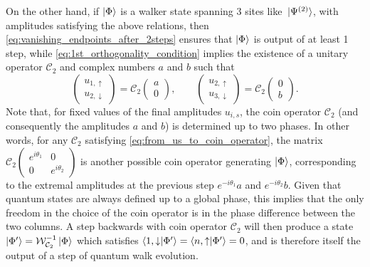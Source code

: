On the other hand, if $\ket\Phi$ is a walker state spanning $3$ sites like $\ket*{\Psi^{(2)}}$, with amplitudes satisfying the above relations,
then \cref{eq:vanishing_endpoints_after_2steps} ensures that $\ket\Phi$ is output of at least 1 step,
while \cref{eq:1st_orthogonality_condition} implies the existence of a unitary operator $\mathcal C_2$ and complex numbers $a$ and $b$ such that
\begin{equation}
	\begin{pmatrix}
		u_{1, \uparrow} \\ u_{2, \downarrow}
	\end{pmatrix}
	=
	\mathcal C_2
	\begin{pmatrix}
		a \\ 0
	\end{pmatrix},
	\qquad
	\begin{pmatrix}
		u_{2, \uparrow} \\ u_{3, \downarrow}
	\end{pmatrix}
	=
	\mathcal C_2
	\begin{pmatrix}
		0 \\ b
	\end{pmatrix}.
	\label{eq:from_us_to_coin_operator}
\end{equation}
Note that, for fixed values of the final amplitudes $u_{i,s}$, the coin operator $\mathcal C_2$ (and consequently the amplitudes $a$ and $b$) is determined up to two phases.
In other words, for any $\mathcal C_2$ satisfying \cref{eq:from_us_to_coin_operator}, the matrix
$\mathcal C_2 \begin{pmatrix}
	e^{i\theta_1} & 0 \\ 0 & e^{i\theta_2}
\end{pmatrix}$
is another possible coin operator generating $\ket\Phi$, corresponding to the extremal amplitudes at the previous step $e^{-i\theta_1}a$ and $e^{-i\theta_2}b$.
Given that quantum states are always defined up to a global phase, this implies that the only freedom in the choice of the coin operator is in the phase difference between the two columns.
A step backwards with coin operator $\mathcal C_2$ will then produce a state $\ket{\Phi'} = \mathcal{W}_{\mathcal C_2}^{-1}\ket\Phi$ which satisfies
$
\braket{1, \downarrow}{\Phi'} =
\braket{n, \uparrow}{\Phi'} = 0
$,
and is therefore itself the output of a step of quantum walk evolution.

